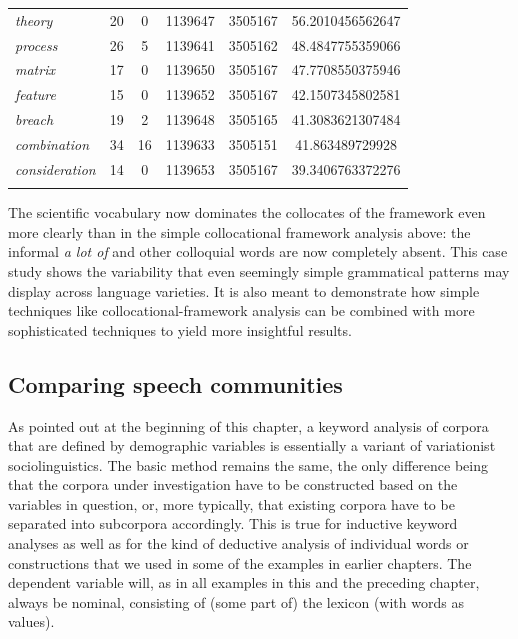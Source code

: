 \begin{table}
{\begin{tabular}[t]{l *{2}{S[table-format=4]} *{2}{S[table-format=8]} S}
\textit{theory} & 20 & 0 & 1139647 & 3505167 & 56.2010456562647 \\
\textit{process} & 26 & 5 & 1139641 & 3505162 & 48.4847755359066 \\
\textit{matrix} & 17 & 0 & 1139650 & 3505167 & 47.7708550375946 \\
\textit{feature} & 15 & 0 & 1139652 & 3505167 & 42.1507345802581 \\
\textit{breach} & 19 & 2 & 1139648 & 3505165 & 41.3083621307484 \\
\textit{combination} & 34 & 16 & 1139633 & 3505151 & 41.863489729928 \\
\textit{consideration} & 14 & 0 & 1139653 & 3505167 & 39.3406763372276 \\
\lspbottomrule
{} \\ %
\end{tabular}}
\end{table}

The scientific vocabulary now dominates the collocates  of the framework even more clearly than in the simple collocational framework  analysis above: the informal \textit{a lot of} and other colloquial words are now completely absent. This case study shows the variability that even seemingly simple grammatical  patterns may display across language varieties.  It is also meant to demonstrate how simple techniques like collocational\hyp{}framework  analysis can be combined with more sophisticated techniques to yield more insightful results.

\subsection{Comparing speech communities}
\label{sec:comparingspeechcommunities}

As pointed out at the beginning of this chapter, a keyword  analysis of corpora that are defined by demographic  variables is essentially a variant of variationist  sociolinguistics.  The basic method remains the same, the only difference being that the corpora under investigation have to be constructed based on the variables in question, or, more typically, that existing corpora have to be separated into subcorpora accordingly. This is true for inductive  keyword analyses as well as for the kind of deductive  analysis of individual words or constructions that we used in some of the examples in earlier chapters. The dependent variable will, as in all examples in this and the preceding chapter, always be nominal,  consisting of (some part of) the lexicon  (with words as values).

